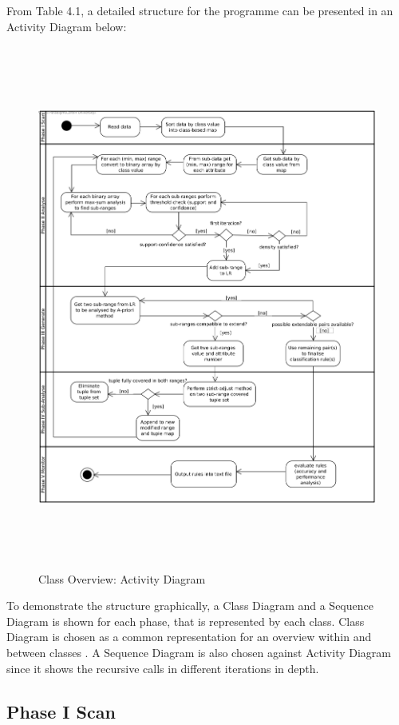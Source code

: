 From Table 4.1, a detailed structure for the programme can be presented in an Activity Diagram below:
\begin{figure}[h]
    \centering
    \includegraphics[width=6.5in, height=6.8in]{figures/activity_overview}
    \caption[Class Overview: Activity Diagram]{Class Overview: Activity Diagram}
    \label{fig:figure4_1}
\end{figure}


 To demonstrate the structure graphically, a Class Diagram and a Sequence Diagram is shown for each phase, that is represented by each class. Class Diagram is chosen as a common representation for an overview within and between classes \cite{seclass}. A Sequence Diagram is also chosen against Activity Diagram since it shows the recursive calls in different iterations in depth.

\subsection{Phase I Scan}

